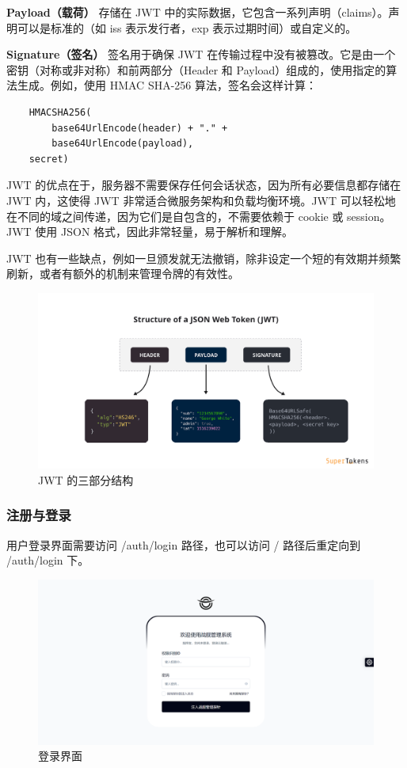 \documentclass{base}
\begin{document}
\textbf{Payload（载荷）} 存储在 JWT 中的实际数据，它包含一系列声明（claims）。声明可以是标准的（如 iss 表示发行者，exp 表示过期时间）或自定义的。

\textbf{Signature（签名）} 签名用于确保 JWT 在传输过程中没有被篡改。它是由一个密钥（对称或非对称）和前两部分（Header 和 Payload）组成的，使用指定的算法生成。例如，使用 HMAC SHA-256 算法，签名会这样计算：

\begin{verbatim}
	HMACSHA256(
		base64UrlEncode(header) + "." +
		base64UrlEncode(payload),
	secret)
\end{verbatim}

JWT 的优点在于，服务器不需要保存任何会话状态，因为所有必要信息都存储在 JWT 内，这使得 JWT 非常适合微服务架构和负载均衡环境。JWT 可以轻松地在不同的域之间传递，因为它们是自包含的，不需要依赖于 cookie 或 session。JWT 使用 JSON 格式，因此非常轻量，易于解析和理解。

JWT 也有一些缺点，例如一旦颁发就无法撤销，除非设定一个短的有效期并频繁刷新，或者有额外的机制来管理令牌的有效性。

\begin{figure}[H]
	\centering
	\includegraphics[width=\linewidth]{images/JWT}
	\caption{JWT 的三部分结构}
	\label{fig:jwt}
\end{figure}

\subsubsection{注册与登录}

用户登录界面需要访问 /auth/login 路径，也可以访问 / 路径后重定向到 /auth/login 下。

\begin{figure}[H]
	\centering
	\includegraphics[width=\linewidth]{images/LoginPage}
	\caption{登录界面}
	\label{fig:loginpage}
\end{figure}
\end{document}
